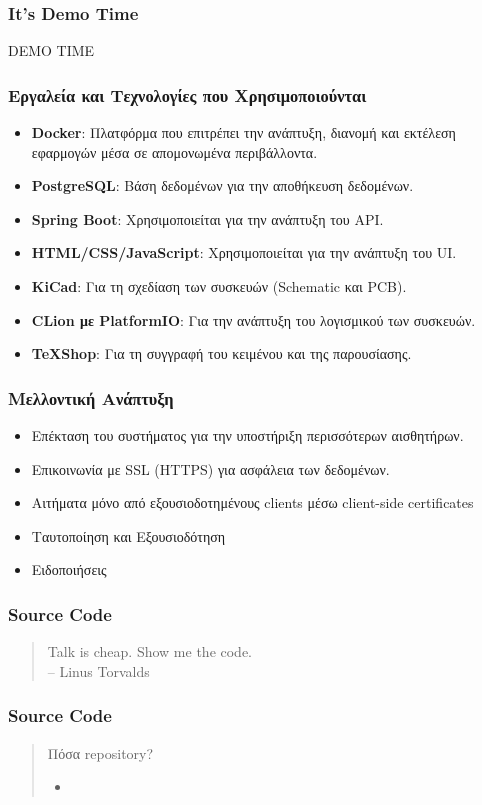 \documentclass{beamer}
\begin{document}
\begin{frame}
\frametitle{It's Demo Time}
DEMO TIME
\end{frame}

\begin{frame}
\frametitle{Εργαλεία και Τεχνολογίες που Χρησιμοποιούνται}
\begin{itemize}
    \item \textbf{Docker}: Πλατφόρμα που επιτρέπει την ανάπτυξη, διανομή και εκτέλεση εφαρμογών μέσα σε απομονωμένα περιβάλλοντα.
    \item \textbf{PostgreSQL}: Βάση δεδομένων για την αποθήκευση δεδομένων.
    \item \textbf{Spring Boot}: Χρησιμοποιείται για την ανάπτυξη του API.
    \item \textbf{HTML/CSS/JavaScript}: Χρησιμοποιείται για την ανάπτυξη του UI.
    \item \textbf{KiCad}: Για τη σχεδίαση των συσκευών (Schematic και PCB).
    \item \textbf{CLion με PlatformIO}: Για την ανάπτυξη του λογισμικού των συσκευών.
    \item \textbf{TeXShop}: Για τη συγγραφή του κειμένου και της παρουσίασης.
\end{itemize}
\end{frame}

\begin{frame}
\frametitle{Μελλοντική Ανάπτυξη}
\begin{itemize}
    \item Επέκταση του συστήματος για την υποστήριξη περισσότερων αισθητήρων.
    \item Επικοινωνία με SSL (HTTPS) για ασφάλεια των δεδομένων.
    \item Αιτήματα μόνο από εξουσιοδοτημένους clients μέσω client-side certificates
    \item Ταυτοποίηση και Εξουσιοδότηση
    \item Ειδοποιήσεις
\end{itemize}
\end{frame}

\begin{frame}
\frametitle{Source Code}
\begin{quote}
Talk is cheap. Show me the code.  
\\ \hfill -- Linus Torvalds
\end{quote}
\end{frame}

\begin{frame}
\frametitle{Source Code}
\begin{quote}
Πόσα repository?
\begin{itemize}
    \item 
\end{itemize}
\end{quote}
\end{frame}
\end{document}
